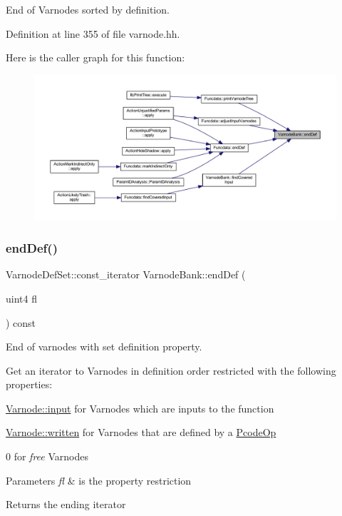End of Varnodes sorted by definition. 



Definition at line 355 of file varnode.\+hh.

Here is the caller graph for this function\+:
\nopagebreak
\begin{figure}[H]
\begin{center}
\leavevmode
\includegraphics[width=350pt]{class_varnode_bank_a47fdb654fdb22a784fe2d4924ea7d75d_icgraph}
\end{center}
\end{figure}
\mbox{\label{class_varnode_bank_a84936e0c795704467a7de83f5a83582d}} 
\subsubsection{\texorpdfstring{endDef()}{endDef()}\hspace{0.1cm}{\footnotesize\ttfamily [2/3]}}
{\footnotesize\ttfamily Varnode\+Def\+Set\+::const\+\_\+iterator Varnode\+Bank\+::end\+Def (\begin{DoxyParamCaption}\item[{uint4}]{fl }\end{DoxyParamCaption}) const}



End of varnodes with set definition property. 

Get an iterator to Varnodes in definition order restricted with the following properties\+:
\begin{DoxyItemize}
\item \mbox{\hyperlink{class_varnode_ad367c0ac3c08b6f41e7334e90a138e8ca9c9363556459d8828a5ab58c370ccd2e}{Varnode\+::input}} for Varnodes which are inputs to the function
\item \mbox{\hyperlink{class_varnode_ad367c0ac3c08b6f41e7334e90a138e8ca16c6748ecb7542c2f79d81be83098dd5}{Varnode\+::written}} for Varnodes that are defined by a \mbox{\hyperlink{class_pcode_op}{Pcode\+Op}}
\item 0 for {\itshape free} Varnodes 
\begin{DoxyParams}{Parameters}
{\em fl} & is the property restriction \\
\hline
\end{DoxyParams}
\begin{DoxyReturn}{Returns}
the ending iterator 
\end{DoxyReturn}

\end{DoxyItemize}

